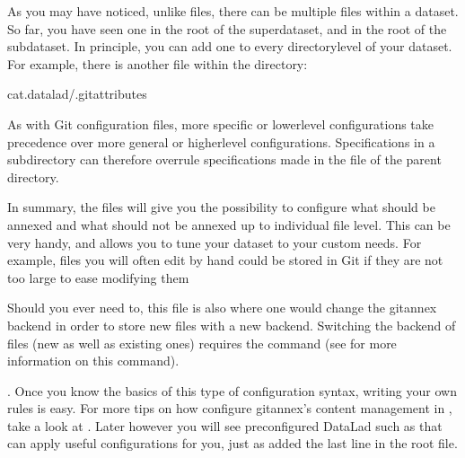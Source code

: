 \sphinxAtStartPar
As you may have noticed, unlike  files,
there can be multiple  files within a dataset. So far, you have seen one
in the root of the superdataset, and in the root of the  subdataset.
In principle, you can add one to every directory\sphinxhyphen{}level of your dataset.
For example, there is another  file within the
 directory:

\begin{sphinxVerbatim}[commandchars=\\\{\}]
cat.datalad/.gitattributes
\end{sphinxVerbatim}

\sphinxAtStartPar
As with Git configuration files, more specific or lower\sphinxhyphen{}level configurations take precedence
over more general or higher\sphinxhyphen{}level configurations. Specifications in a subdirectory can
therefore overrule specifications made in the  file of the parent
directory.

\sphinxAtStartPar
In summary, the  files will give you the possibility to configure
what should be annexed and what should not be annexed up to individual file level.
This can be very handy, and allows you to tune your dataset to your custom needs.
For example, files you will often edit by hand could be stored in Git if they are
not too large to ease modifying them%
\begin{footnote}\sphinxAtStartFootnote
Should you ever need to, this file is also where one would change the git\sphinxhyphen{}annex
backend in order to store new files with a new backend. Switching the backend of
 files (new as well as existing ones) requires the 
command
(see  for
more information on this command).
%
\end{footnote}.
Once you know the basics of this type of configuration syntax, writing
your own rules is easy. For more tips on how configure git\sphinxhyphen{}annex’s content
management in , take a look at .
Later however you will see preconfigured DataLad  such as  that
can apply useful configurations for you, just as  added the last line
in the root  file.

